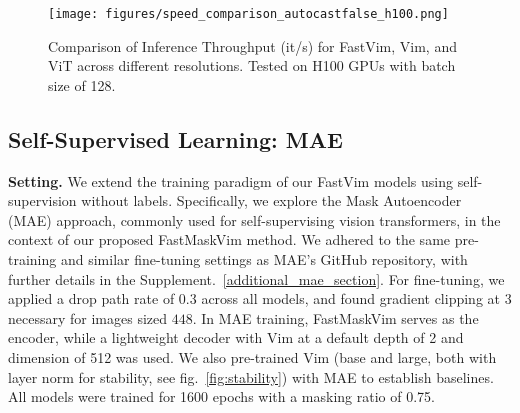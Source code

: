 \begin{figure}[!h]
\centering
    \texttt{[image: figures/speed\_comparison\_autocastfalse\_h100.png]} 
    \vspace{-12pt}
    \caption{
    Comparison of Inference Throughput (it/s) for FastVim, Vim, and ViT across different resolutions. Tested on H100 GPUs with batch size of 128.
    }
    \vspace{-6pt}
    \label{fig:throughput}
\end{figure}


\subsection{Self-Supervised Learning: MAE}
\label{subexp:mae}

\noindent \textbf{Setting.} We extend the training paradigm of our FastVim models using self-supervision without labels. Specifically, we explore the Mask Autoencoder~\cite{mae} (MAE) approach, commonly used for self-supervising vision transformers, in the context of our proposed FastMaskVim method. We adhered to the same pre-training and similar fine-tuning settings as MAE's GitHub repository, with further details in the Supplement.~\ref{additional_mae_section}. For fine-tuning, we applied a drop path rate of 0.3 across all models, and found gradient clipping at 3 necessary for images sized \(448\). In MAE training, FastMaskVim serves as the encoder, while a lightweight decoder with Vim at a default depth of 2 and dimension of 512 was used. We also pre-trained Vim (base and large, both with layer norm for stability, see fig.~\ref{fig:stability}) with MAE to establish baselines. All models were trained for 1600 epochs with a masking ratio of 0.75. 


